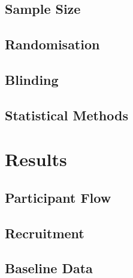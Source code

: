 \documentclass[12pt]{article}
\begin{document}
\subsection{Sample Size}

\subsection{Randomisation}

\subsection{Blinding}

\subsection{Statistical Methods}

\section{Results}

\subsection{Participant Flow}

\subsection{Recruitment}

\subsection{Baseline Data}
\end{document}
